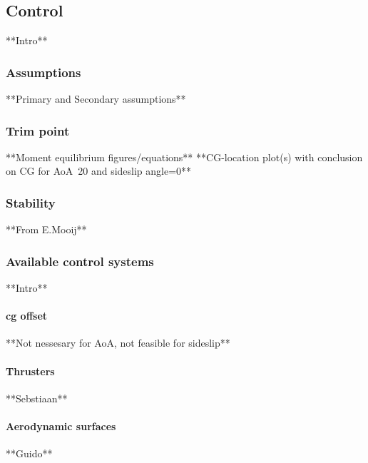 \subsection{Control}

**Intro**

\subsubsection{Assumptions}

**Primary and Secondary assumptions**

\subsubsection{Trim point}

**Moment equilibrium figures/equations**
**CG-location plot(s)  with conclusion on CG for AoA~20 and sideslip angle=0**

\subsubsection{Stability}

**From E.Mooij**

\subsubsection{Available control systems}

**Intro**

\paragraph{\acrfull{cg} offset}

**Not nessesary for AoA, not feasible for sideslip**

\paragraph{Thrusters}

**Sebstiaan**

\paragraph{Aerodynamic surfaces}

**Guido**




